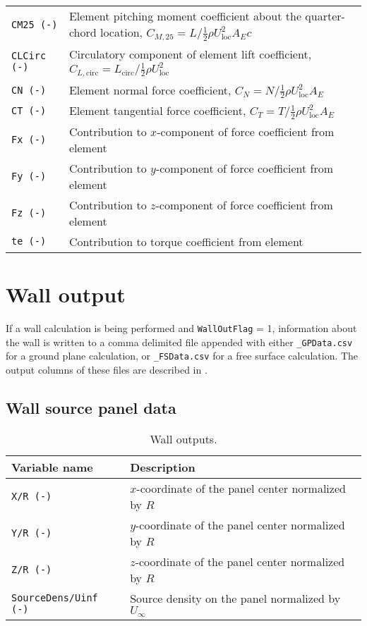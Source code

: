 \begin{table}[!htbp]
\begin{tabular}{p{}p{}}
\texttt{CM25 (-)}            & Element pitching moment coefficient about the quarter-chord location, $C_{M,25}=L/{\frac{1}{2} \rho U_\textrm{loc}^2 A_E c}$ \\
\texttt{CLCirc (-)}          & Circulatory component of element lift coefficient, $C_{L,\textrm{circ}}={L_\textrm{circ}}/{\frac{1}{2} \rho U_\textrm{loc}^2}$ \\
\texttt{CN (-)}              & Element normal force coefficient, $C_N = {N}/{\frac{1}{2} \rho U_\textrm{loc}^2 A_E}$ \\ 
\texttt{CT (-)}              & Element tangential force coefficient, $C_T = {T}/{\frac{1}{2} \rho U_\textrm{loc}^2 A_E}$ \\
\texttt{Fx (-)}              & Contribution to $x$-component of force coefficient from element \\
\texttt{Fy (-)}              & Contribution to $y$-component of force coefficient from element \\
\texttt{Fz (-)}              & Contribution to $z$-component of force coefficient from element \\
\texttt{te (-)}              & Contribution to torque coefficient from element \\
\bottomrule
\end{tabular}
\end{table}

\section{Wall output}
If a wall calculation is being performed and \texttt{WallOutFlag} = 1, information about the wall is written to a comma delimited file appended with either \texttt{\_GPData.csv} for a ground plane calculation, or \texttt{\_FSData.csv} for a free surface calculation. The output columns of these files are described in .

\subsection{Wall source panel data}
\begin{table}[!htbp]
\centering
\caption{Wall outputs.}
\label{tbl:output_wall}
\begin{tabular}{p{}p{}}
\toprule
Variable name & Description \\ \midrule
\texttt{X/R (-)}             & $x$-coordinate of the panel center normalized by $R$ \\
\texttt{Y/R (-)}             & $y$-coordinate of the panel center normalized by $R$ \\
\texttt{Z/R (-)}             & $z$-coordinate of the panel center normalized by $R$ \\
\texttt{SourceDens/Uinf (-)} & Source density on the panel normalized by $U_\infty$ \\
\bottomrule
\end{tabular}
\end{table}

